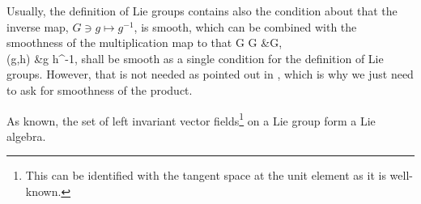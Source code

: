 \begin{remark}
\leavevmode\newline
Usually, the definition of Lie groups contains also the condition about that the inverse map, $G\ni g \mapsto g^{-1}$, is smooth, which can be combined with the smoothness of the multiplication map to that 
\bas
G \times G &\to G, \\
(g,h) &\mapsto g \cdot h^{-1},
\eas
shall be smooth as a single condition for the definition of Lie groups. However, that is not needed as pointed out in \cite[Remark 1.1.8, page 7; see also Exercise 1.9.5, page 76f.]{hamilton}, which is why we just need to ask for smoothness of the product. 
%
\end{remark}

As known, the set of left invariant vector fields\footnote{This can be identified with the tangent space at the unit element as it is well-known.} on a Lie group form a Lie algebra.

